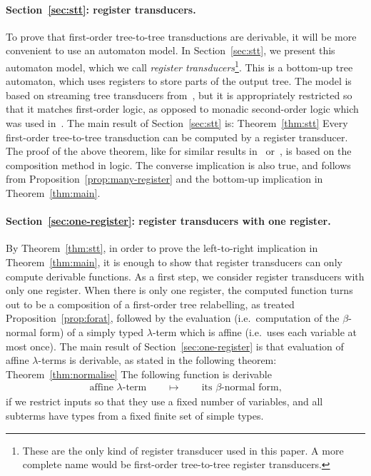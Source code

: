  \paragraph*{Section~\ref{sec:stt}: register transducers.} To prove that  first-order tree-to-tree transductions are derivable, it will be more convenient to use an automaton model. In Section~\ref{sec:stt}, we present  this  automaton model, which we call \emph{register transducers}\footnote{These are the only kind of register transducer used in this paper. A more complete name would be first-order tree-to-tree register transducers.}. This  is a bottom-up tree automaton, which uses registers to store parts of the output tree. The model is based on streaming tree transducers from~\cite{alur2017streaming}, but it is  appropriately restricted so that it matches first-order logic, as opposed to monadic second-order logic which was used in~\cite{alur2017streaming}. The main result of Section~\ref{sec:stt} is:
    \announce
    {Theorem~\ref{thm:stt}}
    {Every first-order  tree-to-tree transduction can be computed by a  register transducer.}
    The proof of the above theorem, like for similar results in~\cite{alur2017streaming} or~\cite[Theorem 23]{engelfrietMSODefinableString2001}, is based on the composition method in logic. 
    The converse implication is also true, and follows from Proposition~\ref{prop:many-register} and the bottom-up implication in Theorem~\ref{thm:main}.
    
     \paragraph*{Section~\ref{sec:one-register}: register transducers with one register.} By Theorem~\ref{thm:stt}, in order to prove the left-to-right implication in Theorem~\ref{thm:main}, it is enough to show that register transducers can only compute  derivable  functions. As a first step, we consider register transducers with only one register. When there is only one register, the computed function turns out to be a composition of a first-order tree relabelling, as treated  Proposition~\ref{prop:forat}, followed by the evaluation (i.e.~computation of the $\beta$-normal form) of    a simply typed $\lambda$-term which is affine (i.e.~uses each variable at most once). The main result of Section~\ref{sec:one-register} is that evaluation of  affine $\lambda$-terms is  derivable, as stated in the following theorem:
    \announce
    {Theorem~\ref{thm:normalise}}
    {The following function is derivable
    \begin{align*}
    \text{affine $\lambda$-term} \qquad \mapsto \qquad \text{its $\beta$-normal form,}
    \end{align*}
    if we restrict inputs so that they use  a fixed number of variables, and all subterms have types from a fixed finite set of simple types. }
    

